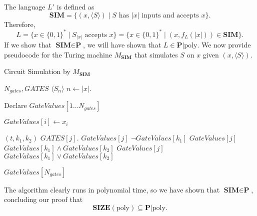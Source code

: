 \documentclass{amsart}
\theoremstyle{plain}
\theoremstyle{definition}
\newcommand{\size}[1]{\textbf{SIZE}(#1)}
\newcommand{\poly}{\text{poly}}
\newcommand{\advice}[2]{#1 | #2}
\newcommand{\p}{\textbf{P}}
\begin{document}
\begin{enumerate}[label=\textbf{Exercise \arabic*:}, leftmargin=0cm, labelwidth=-0.2cm, align=left]
        The language $L'$ is defined as
        \[
            \textbf{SIM}
            = \{ (x, \langle S \rangle) \mid S \text{ has } |x| \text{ inputs and accepts } x\}.
        \]
        Therefore,
        \[
            L = \{ x \in \{0, 1\}^* \mid S_{|x|} \text{ accepts } x \}
            = \{ x \in \{0, 1\}^* \mid (x, f_L(|x|)) \in \textbf{SIM} \}.
        \]
        If we show that $\textbf{SIM} \in \p$, we will have shown that $L \in \advice{\p}{\poly}$.
        We now provide pseudocode for the Turing machine $M_{\textbf{SIM}}$ that simulates $S$ on $x$ given $(x, \langle S \rangle)$.

        \begin{algorithm}[H] %
        \caption{Circuit Simulation by $M_{\textbf{SIM}}$}
        \label{alg:circuitsim_m}
        \begin{algorithmic}[1]
            \State $N_{gates}, GATES$ \gets $\langle S_n \rangle$ 
            \State $n \leftarrow |x|$.

            \State Declare $GateValues[1 \dots N_{gates}]$ 

                \State $GateValues[i] \leftarrow x_i$ 
            \EndFor

                \State $(t, k_1, k_2)$ \gets $GATES[j]$. 
                    \State $GateValues[j]$ \gets $\neg GateValues[k_1]$
                    \State $GateValues[j]$ \gets $GateValues[k_1] \land GateValues[k_2]$
                    \State $GateValues[j]$ \gets $GateValues[k_1] \lor GateValues[k_2]$
                \EndIf
            \EndFor

            \State \Return $GateValues[N_{gates}]$
        \EndProcedure
        \end{algorithmic}
        \end{algorithm}

        The algorithm clearly runs in polynomial time,
        so we have shown that $\textbf{SIM} \in \p$, concluding our proof that
        \[
            \size{\poly} \subseteq \advice{\p}{\poly}.
        \]
    \end{enumerate}

    \newpage
    
    
\end{document}
